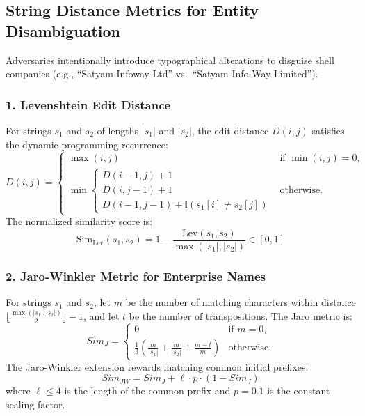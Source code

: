 \subsection{String Distance Metrics for Entity Disambiguation}
Adversaries intentionally introduce typographical alterations to disguise shell companies (e.g., ``Satyam Infoway Ltd'' vs.~``Satyam Info-Way Limited'').

\subsubsection{1. Levenshtein Edit Distance}
For strings $s_1$ and $s_2$ of lengths $|s_1|$ and $|s_2|$, the edit distance $D(i, j)$ satisfies the dynamic programming recurrence:
\begin{equation}
D(i, j) = \begin{cases}
\max(i, j) & \text{if } \min(i, j) = 0, \\
\min \begin{cases}
D(i - 1, j) + 1 \\
D(i, j - 1) + 1 \\
D(i - 1, j - 1) + \mathbb{I}(s_1[i] \ne s_2[j])
\end{cases} & \text{otherwise.}
\end{cases}
\label{eq:levenshtein}
\end{equation}
The normalized similarity score is:
\begin{equation}
\text{Sim}_{\text{Lev}}(s_1, s_2) = 1 - \frac{\text{Lev}(s_1, s_2)}{\max(|s_1|, |s_2|)} \in [0, 1]
\end{equation}

\subsubsection{2. Jaro-Winkler Metric for Enterprise Names}
For strings $s_1$ and $s_2$, let $m$ be the number of matching characters within distance $\lfloor \frac{\max(|s_1|, |s_2|)}{2} \rfloor - 1$, and let $t$ be the number of transpositions. The Jaro metric is:
\begin{equation}
Sim_J = \begin{cases}
0 & \text{if } m = 0, \\
\frac{1}{3}\left(\frac{m}{|s_1|} + \frac{m}{|s_2|} + \frac{m - t}{m}\right) & \text{otherwise.}
\end{cases}
\label{eq:jaro}
\end{equation}
The Jaro-Winkler extension rewards matching common initial prefixes:
\begin{equation}
Sim_{JW} = Sim_J + \ell \cdot p \cdot (1 - Sim_J)
\label{eq:jaro_winkler}
\end{equation}
where $\ell \le 4$ is the length of the common prefix and $p = 0.1$ is the constant scaling factor.


